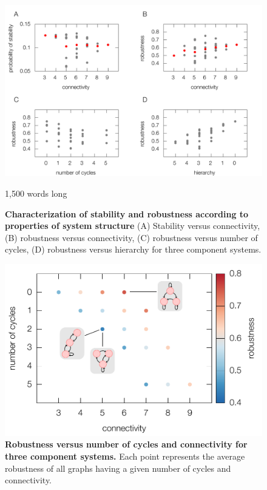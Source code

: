 \begin{figure}[!ht]
\centering
\noindent\includegraphics[width=1.0\columnwidth]{fig/combinedfigs.pdf}
\caption{{\bf Characterization of stability and robustness according to properties of system structure} (A) Stability versus connectivity, (B) robustness versus connectivity, (C) robustness versus number of cycles, (D) robustness versus hierarchy for three component systems.
}1,500 words long
\label{fig:combined}
\end{figure}

\pagebreak

\begin{figure}[!ht]
\centering
\noindent\includegraphics[width=0.8\columnwidth]{fig/connectcycle3D3x3.pdf}
\caption{{\bf Robustness versus number of cycles and connectivity for three component systems.} Each point represents the average robustness of all graphs having a given number of cycles and connectivity.}
\label{fig:connectcycle3D3x3}
\end{figure}

